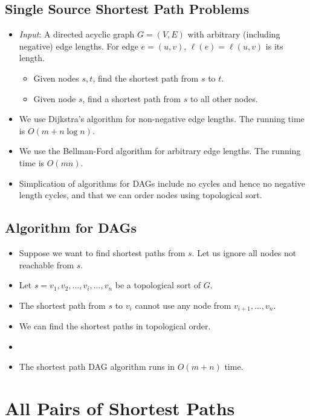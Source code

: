 \documentclass[12pt]{article}
\begin{document}
\subsection{Single Source Shortest Path Problems}
\begin{itemize}
    \item \textit{Input}: A directed acyclic graph $G = (V, E)$ with arbitrary (including negative) edge lengths. For edge $e = (u, v)$, $\ell(e) = \ell(u, v)$ is its length.
    \begin{itemize}
        \item Given nodes $s, t$, find the shortest path from $s$ to $t$.
        \item Given node $s$, find a shortest path from $s$ to all other nodes.
    \end{itemize}
    \item We use Dijkstra's algorithm for non-negative edge lengths. The running time is $O(m + n\log n)$.
    \item We use the Bellman-Ford algorithm for arbitrary edge lengths. The running time is $O(mn)$.
    \item Simplication of algorithms for DAGs include no cycles and hence no negative length cycles, and that we can order nodes using topological sort.
\end{itemize}

\subsection{Algorithm for DAGs}
\begin{itemize}
    \item Suppose we want to find shortest paths from $s$. Let us ignore all nodes not reachable from $s$.
    \item Let $s = v_1, v_2, ..., v_{i}, ..., v_n$ be a topological sort of $G$.
    \item The shortest path from $s$ to $v_i$ cannot use any node from $v_{i + 1}, ..., v_n$.
    \item We can find the shortest paths in topological order.
    \item[] 
    \item The shortest path DAG algorithm runs in $O(m + n)$ time.
\end{itemize}

\section{All Pairs of Shortest Paths}
\end{document}
